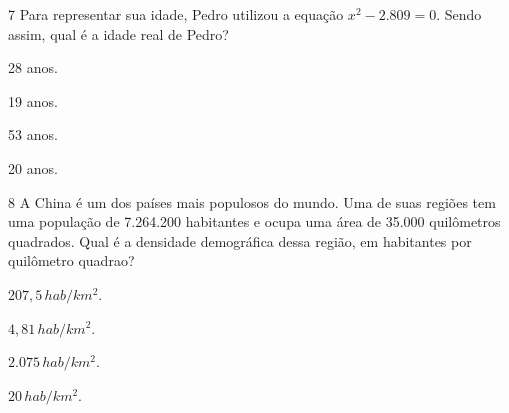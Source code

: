 \num{7} Para representar sua idade, Pedro utilizou a equação $x^2 - 2.809 =
0$. Sendo assim, qual é a idade real de Pedro?

\begin{escolha}
\item 28 anos.
\item 19 anos.
\item 53 anos.
\item 20 anos.
\end{escolha}











\num{8} A China é um dos países mais populosos do mundo. Uma de suas regiões
tem uma população de 7.264.200 habitantes e ocupa uma área de 35.000 quilômetros quadrados. 
Qual é a densidade demográfica dessa região, em habitantes por quilômetro quadrao?

\begin{escolha}
\item $207,5\,hab/km^2$.
\item $4,81\,hab/km^2$.
\item $2.075\,hab/km^2$.
\item $20\,hab/km^2$.
\end{escolha}




